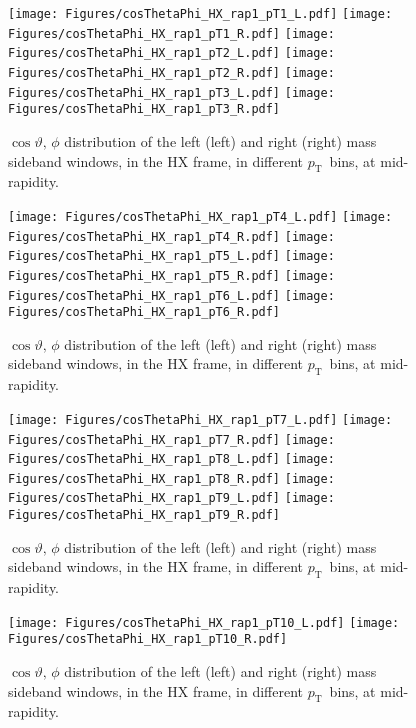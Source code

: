 \documentclass[12pt]{article}
\newcommand{\pt}{$p_{\mathrm{T}}$}
\begin{document}

\begin{figure}[htbp]
\centering
\texttt{[image: Figures/cosThetaPhi\_HX\_rap1\_pT1\_L.pdf]}
\texttt{[image: Figures/cosThetaPhi\_HX\_rap1\_pT1\_R.pdf]}
\texttt{[image: Figures/cosThetaPhi\_HX\_rap1\_pT2\_L.pdf]}
\texttt{[image: Figures/cosThetaPhi\_HX\_rap1\_pT2\_R.pdf]}
\texttt{[image: Figures/cosThetaPhi\_HX\_rap1\_pT3\_L.pdf]}
\texttt{[image: Figures/cosThetaPhi\_HX\_rap1\_pT3\_R.pdf]}
\caption{$\cos\vartheta,\,\phi$ distribution of the left (left) and
  right (right) mass sideband windows, in the HX frame, in different
  \pt\ bins, at mid-rapidity.}
\end{figure}
\clearpage

\begin{figure}[htbp]
\centering
\texttt{[image: Figures/cosThetaPhi\_HX\_rap1\_pT4\_L.pdf]}
\texttt{[image: Figures/cosThetaPhi\_HX\_rap1\_pT4\_R.pdf]}
\texttt{[image: Figures/cosThetaPhi\_HX\_rap1\_pT5\_L.pdf]}
\texttt{[image: Figures/cosThetaPhi\_HX\_rap1\_pT5\_R.pdf]}
\texttt{[image: Figures/cosThetaPhi\_HX\_rap1\_pT6\_L.pdf]}
\texttt{[image: Figures/cosThetaPhi\_HX\_rap1\_pT6\_R.pdf]}
\caption{$\cos\vartheta,\,\phi$ distribution of the left (left) and
  right (right) mass sideband windows, in the HX frame, in different
  \pt\ bins, at mid-rapidity.} 
\end{figure}
\clearpage

\begin{figure}[htbp]
\centering
\texttt{[image: Figures/cosThetaPhi\_HX\_rap1\_pT7\_L.pdf]}
\texttt{[image: Figures/cosThetaPhi\_HX\_rap1\_pT7\_R.pdf]}
\texttt{[image: Figures/cosThetaPhi\_HX\_rap1\_pT8\_L.pdf]}
\texttt{[image: Figures/cosThetaPhi\_HX\_rap1\_pT8\_R.pdf]}
\texttt{[image: Figures/cosThetaPhi\_HX\_rap1\_pT9\_L.pdf]}
\texttt{[image: Figures/cosThetaPhi\_HX\_rap1\_pT9\_R.pdf]}
\caption{$\cos\vartheta,\,\phi$ distribution of the left (left) and
  right (right) mass sideband windows, in the HX frame, in different
  \pt\ bins, at mid-rapidity.}
\end{figure}
\clearpage

\begin{figure}[htbp]
\centering
\texttt{[image: Figures/cosThetaPhi\_HX\_rap1\_pT10\_L.pdf]}
\texttt{[image: Figures/cosThetaPhi\_HX\_rap1\_pT10\_R.pdf]}
\caption{$\cos\vartheta,\,\phi$ distribution of the left (left) and
  right (right) mass sideband windows, in the HX frame, in different
  \pt\ bins, at mid-rapidity.} 
\end{figure}
\clearpage
\end{document}
